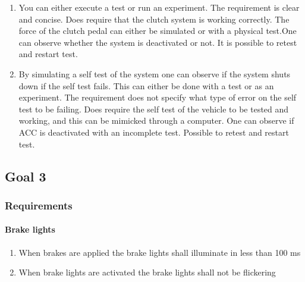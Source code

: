 \begin{enumerate}
    \item You can either execute a test or run an experiment. The requirement is clear and concise. Does require that the clutch system is working correctly. The force of the clutch pedal can either be simulated or with a physical test.One can observe whether the system is deactivated or not. It is possible to retest and restart test.
    \item By simulating a self test of the system one can observe if the system shuts down if the self test fails. This can either be done with a test or as an experiment. The requirement does not specify what type of error on the self test to be failing. Does require the self test of the vehicle to be tested and working, and this can be mimicked through a computer. One can observe if ACC is deactivated with an incomplete test. Possible to retest and restart test.
\end{enumerate}


\subsection{Goal 3}

\subsubsection{Requirements}
\paragraph{Brake lights}
\begin{enumerate}
    \item{When brakes are applied the brake lights shall illuminate in less than 100 ms}
    \item{When brake lights are activated the brake lights shall not be flickering}
\end{enumerate}

